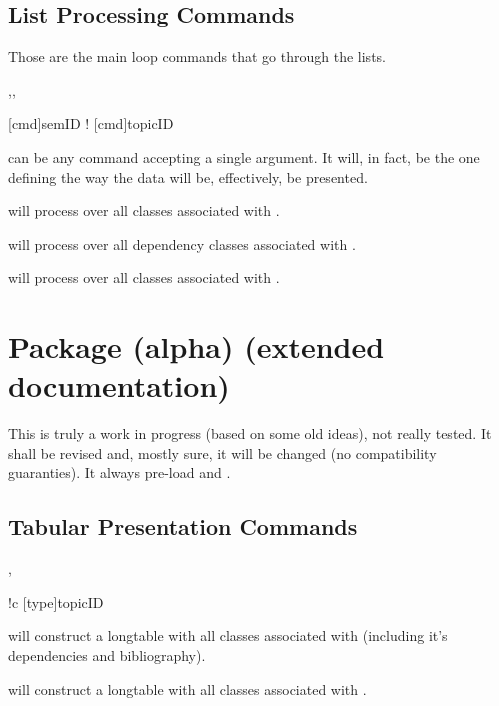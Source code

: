 \documentclass[dctools,english,tocdepth=3,secdepth=3]{ufrgscca} %
\begin{document}
\subsection{List Processing Commands}
Those are the main loop commands that go through the lists.
\begin{Macros}{\LstClass,\LstDep,\LstTopic}
    \begin{Syntax}
        \Macro{\LstClass}[cmd]{semID}
        \Macro!{\LstDep}{}
        \Macro{\LstTopic}[cmd]{topicID}
    \end{Syntax}
 can be any command accepting a single argument. It will, in fact, be the one defining the way the data will be, effectively, be presented.

\Macro{\LstClass}{} will process  over all classes associated with .

\Macro{\LstDep}{} will process  over all dependency classes associated with .

\Macro{\LstTopic}{} will process  over all classes associated with .

\end{Macros}

\section{ Package (alpha) (extended documentation)}
This is truly a work in progress (based on some old ideas), not really tested. It shall be revised and, mostly sure, it will be changed (no compatibility guaranties).  It always pre-load  and .

\subsection{Tabular Presentation Commands}
\begin{Macros}{\TabEtp,\TabTopic}
    \begin{Syntax}%
        \Macro!{\TabEtp}{c}
        \Macro{\TabTopic}[type]{topicID}
    \end{Syntax}
\Macro{\TabEtp}{} will construct a longtable with all classes associated with  (including it's dependencies and bibliography).

\Macro{\TabTopic}{} will construct a longtable with all classes associated with .

\end{Macros}
\end{document}
